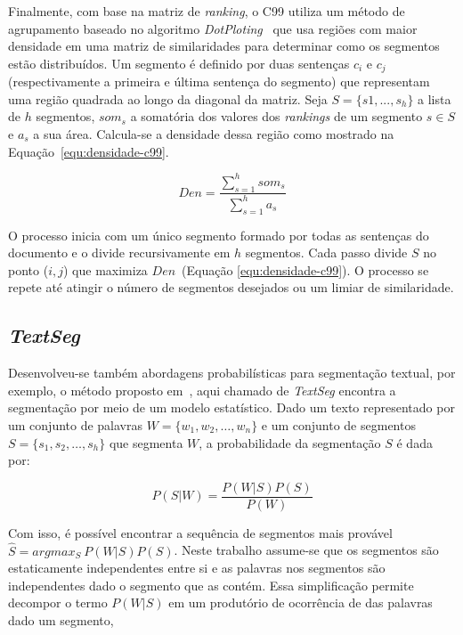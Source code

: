 Finalmente, com base na matriz de \textit{ranking}, o C99 utiliza um método de agrupamento baseado no algoritmo \textit{DotPloting}~\cite{Reynar1998} que usa regiões com maior densidade em uma matriz de similaridades para determinar como os segmentos estão distribuídos.  
% 
Um segmento é definido por duas sentenças $c_i$ e $c_j$ (respectivamente a primeira e última sentença do segmento) que representam uma região quadrada ao longo da diagonal da matriz. 
% 
Seja $S = \{s1,...,s_h\}$ a lista de $h$ segmentos,  $som_s$ a somatória dos valores dos \textit{rankings} de um segmento $s \in S$ e $a_s$ a sua área. 
% 
Calcula-se a densidade dessa região como mostrado na Equação~\ref{equ:densidade-c99}. 



\begin{equation}
Den = \frac{\sum_{s=1}^h som_s}{\sum_{s=1}^h a_s}
\label{equ:densidade-c99}
\end{equation}

O processo inicia com um único segmento formado por todas as sentenças do documento e o divide recursivamente em $h$ segmentos. Cada passo divide $S$ no ponto ($i,j$) que maximiza $Den$~(Equação \ref{equ:densidade-c99}). O processo se repete até atingir o número de segmentos desejados ou um limiar de similaridade.





\subsection*{\textit{TextSeg}}


Desenvolveu-se também abordagens probabilísticas para segmentação textual, por exemplo, o método proposto em~\cite{Utiyama2001}, aqui chamado de \textit{TextSeg} encontra a segmentação por meio de um modelo estatístico. Dado um texto representado por um conjunto de palavras 
$W = \{w_1, w_2, \dots, w_n\}$ e um conjunto de segmentos $S = \{s_1, s_2, \dots, s_h\}$ que segmenta $W$, a probabilidade da segmentação $S$ é dada por:

\begin{equation}
	P(S|W) = \frac{P(W|S)P(S)}{P(W)}
\end{equation}

Com isso, é possível encontrar a sequência de segmentos mais provável $\hat{S} = arg max_S~P(W|S) P(S)$. Neste trabalho assume-se que os segmentos são estaticamente independentes entre si e as palavras nos segmentos são independentes dado o segmento que as contém. Essa simplificação permite decompor o termo $P(W|S)$ em um produtório de ocorrência de das palavras dado um segmento,  

